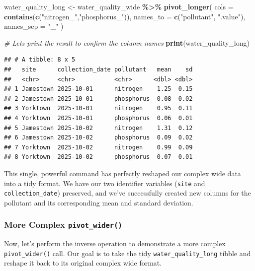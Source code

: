 \documentclass[
  11pt,
]{article}
\newenvironment{Shaded}{\begin{snugshade}}{\end{snugshade}}
\newcommand{\AttributeTok}[1]{\textcolor[rgb]{0.13,0.29,0.53}{#1}}
\newcommand{\CommentTok}[1]{\textcolor[rgb]{0.56,0.35,0.01}{\textit{#1}}}
\newcommand{\FunctionTok}[1]{\textcolor[rgb]{0.13,0.29,0.53}{\textbf{#1}}}
\newcommand{\NormalTok}[1]{#1}
\newcommand{\OtherTok}[1]{\textcolor[rgb]{0.56,0.35,0.01}{#1}}
\newcommand{\SpecialCharTok}[1]{\textcolor[rgb]{0.81,0.36,0.00}{\textbf{#1}}}
\newcommand{\StringTok}[1]{\textcolor[rgb]{0.31,0.60,0.02}{#1}}
\begin{document}
\begin{Shaded}
\begin{Highlighting}[]
\NormalTok{water\_quality\_long }\OtherTok{\textless{}{-}}\NormalTok{ water\_quality\_wide }\SpecialCharTok{\%\textgreater{}\%}
  \FunctionTok{pivot\_longer}\NormalTok{(}
    \AttributeTok{cols =} \FunctionTok{contains}\NormalTok{(}\FunctionTok{c}\NormalTok{(}\StringTok{"nitrogen\_"}\NormalTok{,}\StringTok{"phosphorus\_"}\NormalTok{)),}
    \AttributeTok{names\_to =} \FunctionTok{c}\NormalTok{(}\StringTok{"pollutant"}\NormalTok{, }\StringTok{".value"}\NormalTok{),}
    \AttributeTok{names\_sep =} \StringTok{"\_"}
\NormalTok{  )}

\CommentTok{\# Let\textquotesingle{}s print the result to confirm the column names}
\FunctionTok{print}\NormalTok{(water\_quality\_long)}
\end{Highlighting}
\end{Shaded}

\begin{verbatim}
## # A tibble: 8 x 5
##   site      collection_date pollutant   mean    sd
##   <chr>     <chr>           <chr>      <dbl> <dbl>
## 1 Jamestown 2025-10-01      nitrogen    1.25  0.15
## 2 Jamestown 2025-10-01      phosphorus  0.08  0.02
## 3 Yorktown  2025-10-01      nitrogen    0.95  0.11
## 4 Yorktown  2025-10-01      phosphorus  0.06  0.01
## 5 Jamestown 2025-10-02      nitrogen    1.31  0.12
## 6 Jamestown 2025-10-02      phosphorus  0.09  0.02
## 7 Yorktown  2025-10-02      nitrogen    0.99  0.09
## 8 Yorktown  2025-10-02      phosphorus  0.07  0.01
\end{verbatim}

This single, powerful command has perfectly reshaped our complex wide
data into a tidy format. We have our two identifier variables
(\texttt{site} and \texttt{collection\_date}) preserved, and we've
successfully created new columns for the pollutant and its corresponding
mean and standard deviation.

\subsubsection{\texorpdfstring{More Complex
\texttt{pivot\_wider()}}{More Complex pivot\_wider()}}\label{more-complex-pivot_wider}

Now, let's perform the inverse operation to demonstrate a more complex
\texttt{pivot\_wider()} call. Our goal is to take the tidy
\texttt{water\_quality\_long} tibble and reshape it back to its original
complex wide format.
\end{document}
